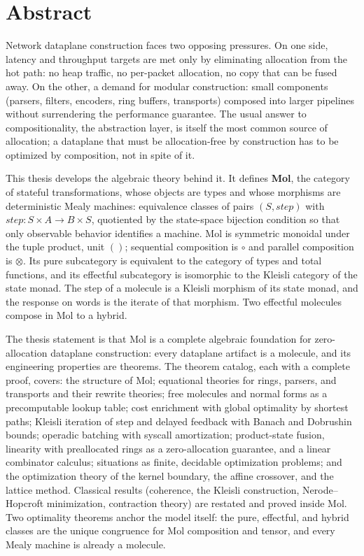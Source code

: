 \chapter*{Abstract}

Network dataplane construction faces two opposing pressures. On one
side, latency and throughput targets are met only by eliminating
allocation from the hot path: no heap traffic, no per-packet
allocation, no copy that can be fused away. On the other, a demand for
modular construction: small components (parsers, filters, encoders,
ring buffers, transports) composed into larger pipelines without
surrendering the performance guarantee. The usual answer to
compositionality, the abstraction layer, is itself the most common
source of allocation; a dataplane that must be allocation-free by
construction has to be optimized by composition, not in spite of it.

This thesis develops the algebraic theory behind it. It defines
\textbf{Mol}, the category of stateful transformations, whose objects
are types and whose morphisms are deterministic Mealy machines:
equivalence classes of pairs $(S, \mathit{step})$ with
$\mathit{step} : S \times A \to B \times S$, quotiented by the
state-space bijection condition so that only observable behavior
identifies a machine. Mol is symmetric monoidal under the tuple
product, unit $()$; sequential composition is $\circ$ and parallel
composition is $\otimes$. Its pure subcategory is equivalent to the
category of types and total functions, and its effectful subcategory is
isomorphic to the Kleisli category of the state monad. The step of a
molecule is a Kleisli morphism of its state monad, and the response on
words is the iterate of that morphism. Two effectful molecules compose
in Mol to a hybrid.

The thesis statement is that Mol is a complete algebraic foundation for
zero-allocation dataplane construction: every dataplane artifact is a
molecule, and its engineering properties are theorems. The theorem
catalog, each with a complete proof, covers: the structure of Mol;
equational theories for rings, parsers, and transports and their
rewrite theories; free molecules and normal forms as a precomputable
lookup table; cost enrichment with global optimality by shortest paths;
Kleisli iteration of step and delayed feedback with Banach and Dobrushin
bounds; operadic batching with syscall amortization; product-state
fusion, linearity with preallocated rings as a zero-allocation
guarantee, and a linear combinator calculus; situations as finite,
decidable optimization problems; and the optimization theory of the
kernel boundary, the affine crossover, and the lattice method.
Classical results (coherence, the Kleisli construction, Nerode--Hopcroft
minimization, contraction theory) are restated and proved inside Mol.
Two optimality theorems anchor the model itself: the pure, effectful,
and hybrid classes are the unique congruence for Mol composition and
tensor, and every Mealy machine is already a molecule.

